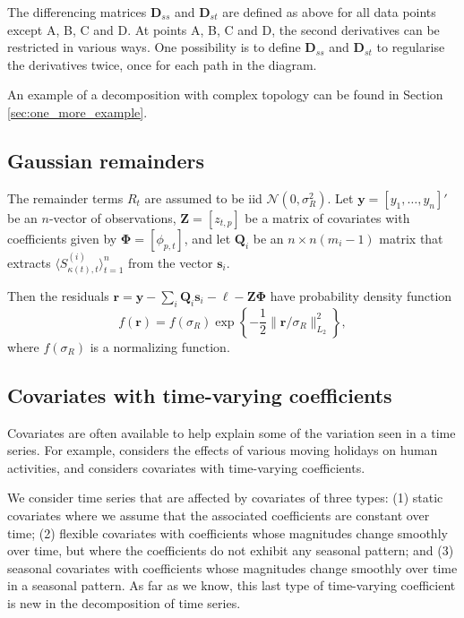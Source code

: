 \documentclass[11pt,a4paper,]{article}
\begin{document}
The differencing matrices \(\bm{D}_{ss}\) and \(\bm{D}_{st}\) are defined as above for all data points except A, B, C and D. At points A, B, C and D, the second derivatives can be restricted in various ways. One possibility is to define \(\bm{D}_{ss}\) and \(\bm{D}_{st}\) to regularise the derivatives twice, once for each path in the diagram.

An example of a decomposition with complex topology can be found in Section \ref{sec:one_more_example}.

\hypertarget{gaussian-remainders}{%
\subsection{Gaussian remainders}\label{gaussian-remainders}}

The remainder terms \(R_{t}\) are assumed to be iid \(\mathcal{N}(0,\sigma_R^2)\).
Let \(\bm{y} = [y_1,\dots,y_n]'\) be an \(n\)-vector of observations, \(\bm{Z}=[z_{t,p}]\) be a matrix of covariates with coefficients given by \(\bm{\Phi} = [\phi_{p,t}]\), and let \(\bm{Q}_i\) be an \(n \times n(m_i-1)\) matrix that extracts \(\langle S^{(i)}_{\kappa(t),t} \rangle_{t=1}^{n}\) from the vector \(\bm{s}_i\).

Then the residuals \(\bm{r} = \bm{y} - \sum_i\bm{Q}_i\bm{s}_i -\bm{\ell} - \bm{Z}\bm{\Phi}\) have probability density function
\[
  f(\bm{r}) = f(\sigma_R)\exp\left\{-\frac{1}{2}\big\|\bm{r}/\sigma_R\big\|_{L_2}^2\right\},
\]
where \(f(\sigma_R)\) is a normalizing function.

\hypertarget{covariates-with-time-varying-coefficients}{%
\subsection{Covariates with time-varying coefficients}\label{covariates-with-time-varying-coefficients}}

Covariates are often available to help explain some of the variation seen in a time series. For example, \textcite{findley2009stock} considers the effects of various moving holidays on human activities, and \textcite{bell2004modeling} considers covariates with time-varying coefficients.

We consider time series that are affected by covariates of three types: (1) static covariates where we assume that the associated coefficients are constant over time; (2) flexible covariates with coefficients whose magnitudes change smoothly over time, but where the coefficients do not exhibit any seasonal pattern; and (3) seasonal covariates with coefficients whose magnitudes change smoothly over time in a seasonal pattern. As far as we know, this last type of time-varying coefficient is new in the decomposition of time series.
\end{document}
